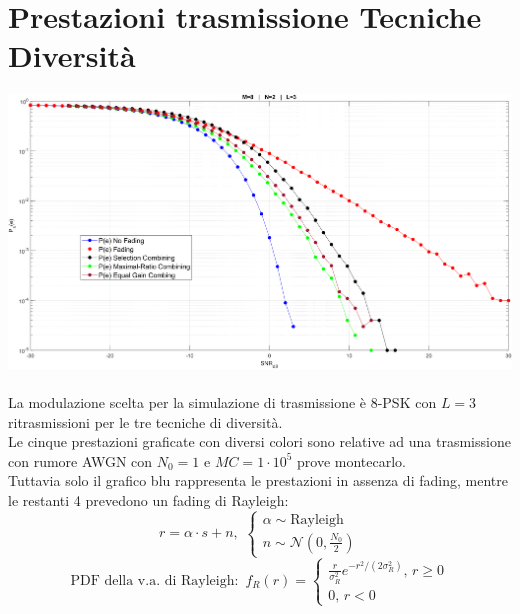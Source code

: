 \documentclass[12pt, a4paper]{article}
\begin{document}
	\section*{Prestazioni trasmissione Tecniche Diversità}
	
	\begin{adjustbox}{width=.95\paperwidth, center}
		\includegraphics{images/untitled1.png}
	\end{adjustbox}\\\\
	La modulazione scelta per la simulazione di trasmissione è 8-PSK con \(L=3\) ritrasmissioni per le tre tecniche di diversità.\\
	Le cinque prestazioni graficate con diversi colori sono relative ad una trasmissione con rumore AWGN con \(N_0=1\) e \(MC=1\cdot10^5\) prove montecarlo.\\
	Tuttavia solo il grafico blu rappresenta le prestazioni in assenza di fading, mentre le restanti 4 prevedono un fading di Rayleigh:\\
	\[
	r=\alpha\cdot s+n, \,\,
	\begin{cases}
		\alpha\sim \text{Rayleigh}\\
		n\sim \mathcal{N}(0,\frac{N_0}{2})		
	\end{cases}
	\]\[
	\text{PDF della v.a. di Rayleigh: }\, f_R(r)=
	\begin{cases}
		\frac{r}{\sigma_R^2}e^{-r^2/(2\sigma_R^2)}, \, r\ge0\\
		0, \, r<0		
	\end{cases}
	\]
	
\end{document}
